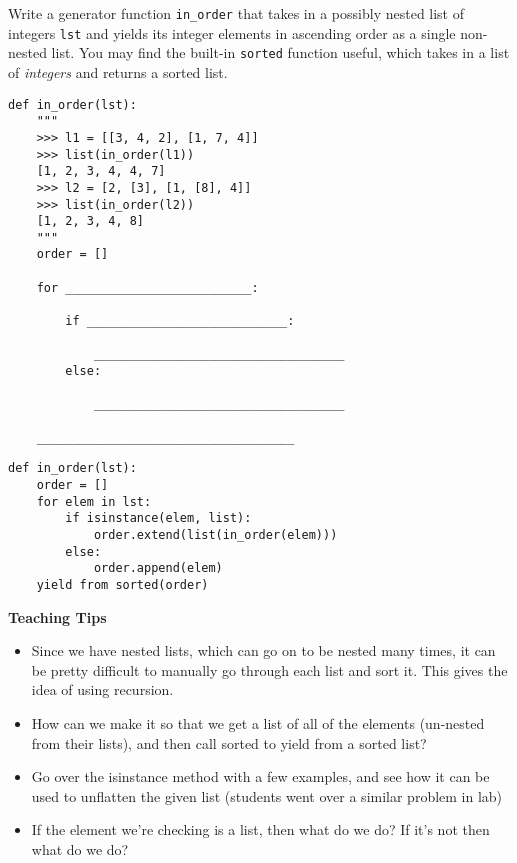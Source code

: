 \question
Write a generator function \lstinline{in_order} that takes in a possibly nested list of integers \lstinline{lst} and yields its integer elements in ascending order as a single non-nested list. You may find the built-in \lstinline{sorted} function useful, which takes in a list of \textit{integers} and returns a sorted list.

\begin{lstlisting}
def in_order(lst):
    """
    >>> l1 = [[3, 4, 2], [1, 7, 4]]
    >>> list(in_order(l1))
    [1, 2, 3, 4, 4, 7]
    >>> l2 = [2, [3], [1, [8], 4]]
    >>> list(in_order(l2))
    [1, 2, 3, 4, 8]
    """
    order = []

    for __________________________:

        if ____________________________:

            ___________________________________
        else:

            ___________________________________

    ____________________________________
\end{lstlisting}

\begin{solution}
\begin{lstlisting}
def in_order(lst):
    order = []
    for elem in lst:
        if isinstance(elem, list):
            order.extend(list(in_order(elem)))
        else:
            order.append(elem)
    yield from sorted(order)
\end{lstlisting}
\end{solution}

\begin{guide}
\begin{blocksection}
\textbf{Teaching Tips}
    \begin{itemize}
    \item Since we have nested lists, which can go on to be nested many times, it can be pretty difficult to manually go through each list and sort it. This gives the idea of using recursion.
    \item How can we make it so that we get a list of all of the elements (un-nested from their lists), and then call sorted to yield from a sorted list?
    \item Go over the isinstance method with a few examples, and see how it can be used to unflatten the given list (students went over a similar problem in lab)
    \item If the element we're checking is a list, then what do we do? If it's not then what do we do?
    \end{itemize}
\end{blocksection}
\end{guide}